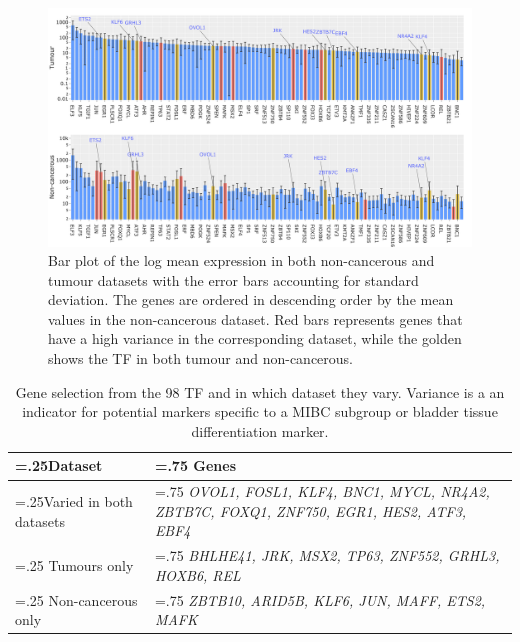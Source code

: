 \begin{figure}[!htb]   
    \centering
    \includegraphics[width=1.0\textwidth,height=1.0\textheight,keepaspectratio]{Sections/Network_I/Resources/selective_pruning/sel_tfs/sel_tfs_var_tum_healthy.png}
      \caption[Mean expression of the 98 TF in tumour and healthy samples]{Bar plot of the log mean expression in both non-cancerous and tumour datasets with the error bars accounting for standard deviation. The genes are ordered in descending order by the mean values in the non-cancerous dataset. Red bars represents genes that have a high variance in the corresponding dataset, while the golden shows the TF in both tumour and non-cancerous.}
    \label{fig:N_I:sel_tfs_var}
\end{figure}



\begin{table}[!htb]
  \centering
  \small
  \begin{tabularx}{\textwidth}{>{\hsize=.25\hsize}X|>{\hsize=.75\hsize}X}
    \toprule
    \textbf{Dataset} & \textbf{Genes} \\
    \midrule
    Varied in both datasets & \textit{OVOL1, FOSL1, KLF4, BNC1, MYCL, NR4A2, ZBTB7C, FOXQ1, ZNF750, EGR1, HES2, ATF3, EBF4} \\
    \midrule
    Tumours only & \textit{BHLHE41, JRK, MSX2, TP63, ZNF552, GRHL3, HOXB6, REL} \\
    \midrule
    Non-cancerous only & \textit{ZBTB10, ARID5B, KLF6, JUN, MAFF, ETS2, MAFK} \\
    \bottomrule
  \end{tabularx}
    \caption[Summary of the subset of 98 TF which are highly varied]{Gene selection from the 98 TF and in which dataset they vary. Variance is a an indicator for potential markers specific to a MIBC subgroup or bladder tissue differentiation marker.}
    \label{tab:N_I:sel_tfs_var}
\end{table}



